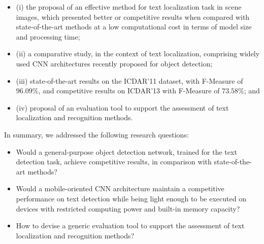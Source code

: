 \begin{itemize}
    \item (i) the proposal of an effective method for text localization task in scene images, which presented better or competitive results when compared with state-of-the-art methods at a low computational cost in terms of model size and processing time; 
    \item (ii) a comparative study, in the context of text localization, comprising widely used CNN architectures recently proposed for object detection;
    \item (iii) state-of-the-art results on the ICDAR'11 dataset, with F-Measure of $96.09\%$, and competitive results on ICDAR'13 with F-Measure of $73.58\%$; and
    \item (iv) proposal of an evaluation tool to support the assessment of text localization and recognition methods. %
\end{itemize}

In summary, we addressed the following research questions:
\begin{itemize}
    \item Would a general-purpose object detection network, trained for the text detection task, achieve competitive results, in comparison with state-of-the-art methods?
    \item Would a mobile-oriented CNN architecture maintain a competitive performance on text detection while being light enough to be executed on devices with restricted computing power and built-in memory capacity?
    
    \item How to devise a generic evaluation tool to support the assessment of text localization and recognition methods?
\end{itemize}


